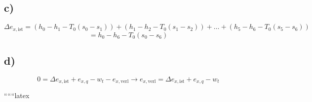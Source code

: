 \subsection*{c)}

\[
\Delta e_{x, \text{ist}} = (h_0 - h_1 - T_0 (s_0 - s_1)) + (h_1 - h_2 - T_0 (s_1 - s_2)) + \ldots + (h_5 - h_6 - T_0 (s_5 - s_6))
\]
\[
= h_0 - h_6 - T_0 (s_0 - s_6)
\]

\subsection*{d)}

\[
0 = \Delta e_{x, \text{ist}} + e_{x, q} - w_t - e_{x, \text{verl}} \rightarrow e_{x, \text{verl}} = \Delta e_{x, \text{ist}} + e_{x, q} - w_t
\]

``````latex


